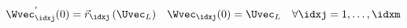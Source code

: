 \begin{defnbox}\nospacing
    \begin{defn}\label{defn:shock_wave_ode}
        \begin{align}
          \Wvec_{\idxj}^{'}(0)=\vec{r}_{\idxj}\left(\Uvec_{L}\right)&&\Wvec_{\idxj}(0)=\Uvec_{L}&&\forall\idxj=1,\ldots,\idxm
        \end{align}
    \end{defn}
\end{defnbox}



